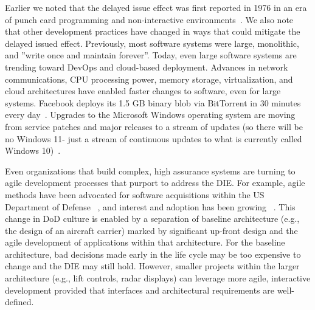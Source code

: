 \documentclass[smallcondensed]{svjour3}
\begin{document}
Earlier we noted that the delayed issue effect was first reported in 1976 in an era of punch card programming and non-interactive environments~\cite{Boehm76}. We also note that other development practices have changed in ways that could   mitigate the delayed issued effect.  Previously,
most software systems were large, monolithic, and ''write once and maintain
forever''. Today, even large software systems are trending toward DevOps and cloud-based deployment. Advances in network communications, CPU processing power, memory storage, virtualization, and cloud architectures have enabled faster changes to software, even for large systems. Facebook deploys its 1.5 GB binary blob via BitTorrent in 30 minutes every day~\cite{Facebook}. 
Upgrades to the Microsoft Windows operating system are moving from service patches and major releases to a stream of updates (so there will be no Windows 11- just a stream of continuous updates to what is currently called Windows 10)~\cite{bright15}.


Even organizations that build complex, high assurance systems are turning to agile development processes that purport to address the DIE. For example, agile methods have been advocated for software acquisitions within the US Department of Defense ~\cite{kim13}, and interest and adoption has been growing ~\cite{lapham11}. 
This change in DoD culture is enabled by a separation of baseline architecture
(e.g., the design of an 
aircraft carrier) marked by significant up-front design and the agile development of applications within that architecture.
For the baseline architecture, bad decisions
made early in the life cycle may be too expensive to change and the DIE may still hold.
However, smaller projects within the larger architecture (e.g., lift controls, radar displays) can leverage more agile, interactive development provided that interfaces and architectural requirements are well-defined. 
 
\end{document}
